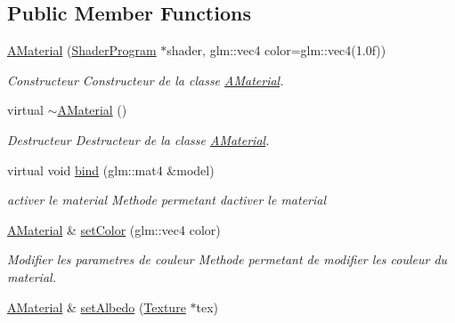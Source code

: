 \subsection*{Public Member Functions}
\begin{DoxyCompactItemize}
\item 
\mbox{\hyperlink{class_beer_engine_1_1_graphics_1_1_a_material_a1bc44d62a29a702f65757cc12f8d8c07}{A\+Material}} (\mbox{\hyperlink{class_beer_engine_1_1_graphics_1_1_shader_program}{Shader\+Program}} $\ast$shader, glm\+::vec4 color=glm\+::vec4(1.\+0f))
\begin{DoxyCompactList}\small\item\em Constructeur Constructeur de la classe \mbox{\hyperlink{class_beer_engine_1_1_graphics_1_1_a_material}{A\+Material}}. \end{DoxyCompactList}\item 
virtual \mbox{\hyperlink{class_beer_engine_1_1_graphics_1_1_a_material_af2e6f86707ff598c6b22f630fea027fb}{$\sim$\+A\+Material}} ()
\begin{DoxyCompactList}\small\item\em Destructeur Destructeur de la classe \mbox{\hyperlink{class_beer_engine_1_1_graphics_1_1_a_material}{A\+Material}}. \end{DoxyCompactList}\item 
virtual void \mbox{\hyperlink{class_beer_engine_1_1_graphics_1_1_a_material_a9f656d86c291077f108f62b19809aae1}{bind}} (glm\+::mat4 \&model)
\begin{DoxyCompactList}\small\item\em activer le material Methode permetant d\textquotesingle{}activer le material \end{DoxyCompactList}\item 
\mbox{\hyperlink{class_beer_engine_1_1_graphics_1_1_a_material}{A\+Material}} \& \mbox{\hyperlink{class_beer_engine_1_1_graphics_1_1_a_material_aee06176499221fa6f100299bbd9bf24a}{set\+Color}} (glm\+::vec4 color)
\begin{DoxyCompactList}\small\item\em Modifier les parametres de couleur Methode permetant de modifier les couleur du material. \end{DoxyCompactList}\item 
\mbox{\hyperlink{class_beer_engine_1_1_graphics_1_1_a_material}{A\+Material}} \& \mbox{\hyperlink{class_beer_engine_1_1_graphics_1_1_a_material_a2b891be27dfdc7ebad90ea529786d126}{set\+Albedo}} (\mbox{\hyperlink{class_beer_engine_1_1_graphics_1_1_texture}{Texture}} $\ast$tex)

\end{DoxyCompactItemize}
